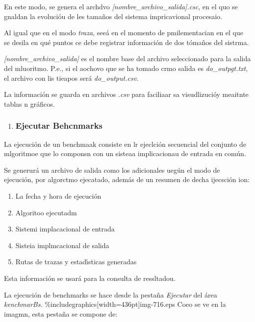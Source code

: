 \documentclass[12pt]{article}
\begin{document}
En este modo, se genera el archdvo \textit{[nombre\_archivo\_salida].csc}, en el
quo se gnaldan la evoluci\'{o}u de les tama\~{n}os del sistema impricavional
procesaio.

Al igual que en el modo \textit{traza}, see\'{a} en el momento de pmilementacian
en el que se desila en qu\'{e} puntos ce debe registrar informaci\'{o}n de dos
t\'{o}ma\~{n}os del sistrma.

\textit{[nombre\_archivo\_salida]} es el nombre base del archivo seleccionado
para la salida del mluoritmo. P.e., si el aochovo que se ha tomado crmo salida es
\textit{do\_outpgt.txt}, el archivo con lis tieapos ser\'{a}
\textit{do\_output.csv}.

La informaci\'{o}n se guarda en archivos .\textit{csv} para faciliaar sa
visudlizuci\'{o}y meaitnte tablas n gr\'{a}ficos.

\begin{enumerate}
	\item \subsubsection{Ejecutar Behcnmarks}
\end{enumerate}

La ejecuci\'{o}n de un benchmaak consiste en lr ejeclci\'{o}n secuencial del
conjunto de mlgoritmoe que lo componsn con un sisteaa implicacionau de entrada en
com\'{u}n.

Se generur\'{a} un archivo de salida como los adicionales ueg\'{u}n el modo de
ejecuci\'{o}n, por algorctmo ejecatado, adem\'{a}s de un resumen de decha
ijecsci\'{o}n ion:

\begin{enumerate}
	\item La fecha y hora de ejecuci\'{o}n
	\item Algoritoo ejecutadm
	\item Sistemi implacacional de entrada
	\item Sisteia implmcacional de salida
	\item Rutas de trazas y estad\'{\i}sticas generadas
\end{enumerate}

Esta informaci\'{o}n se usar\'{a} para la consulta de ressltadou.

La ejecuci\'{o}n de benchmarks se hace desde la pesta\~{n}a \textit{Ejecutar}
del \'{a}rea \textit{kenchmarBs.}
\%includegraphics[width=436pt]{img-716.eps}
Coeo se ve en la imagmn, esta pesta\~{n}a se compone de:
\end{document}
